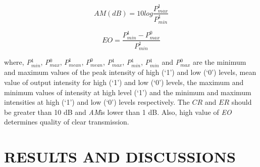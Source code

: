 \documentclass{osa-article}
\begin{document}
\begin{equation}
AM(dB)=10log\frac{P^1_{max}} {P^1_{min}}
\label{eq:3}
\end{equation}
 
\begin{equation}
EO=\frac{P^1_{min}-P^0_{max}} {P^1_{min}}
\label{eq:4}
\end{equation}

where, \textit {P$^1_{min}$}, \textit {P$^0_{max}$}, $P^1_{mean}$, $P^0_{mean}$,  \textit {P$^1_{max}$}, \textit {P$^1_{min}$}, \textit {P$^1_{min}$} and \textit {P$^0_{max}$} are the minimum and maximum values of the peak intensity of high (`1') and low (`0') levels, mean value of output intensity for high (`1') and low (`0') levels, the maximum and minimum values of intensity at high level (`1') and the minimum and maximum intensities at high (`1') and low (`0') levels respectively. The $CR$ and $ER$ should be greater than 10 dB and \textit{AM}is lower than 1 dB. Also, high value of \textit{EO} determines quality of clear transmission.

\section{RESULTS AND DISCUSSIONS }
\label{}
\end{document}
